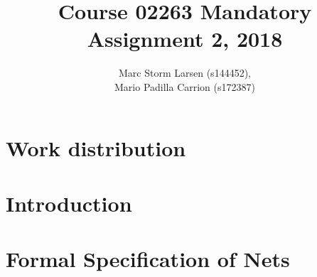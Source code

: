 \documentclass[a4]{article}
\title{Course 02263 Mandatory Assignment 2, 2018}
\author{Marc Storm Larsen (s144452),\\ 
        Mario Padilla Carrion (s172387)}
\begin{document}
\maketitle

\tableofcontents
\newpage

\section{Work distribution}

\section{Introduction}

\section{Formal Specification of Nets}


\end{document}
